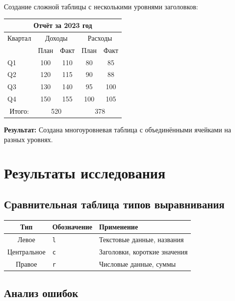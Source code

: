 \documentclass[12pt,a4paper]{article}
\begin{document}
Создание сложной таблицы с несколькими уровнями заголовков:

\begin{center}
\begin{tabular}{|l|c|c|c|c|}
\hline
\multicolumn{5}{|c|}{\textbf{Отчёт за 2023 год}} \\
\hline
\multicolumn{1}{|c|}{Квартал} & \multicolumn{2}{c|}{Доходы} & \multicolumn{2}{c|}{Расходы} \\
\hline
& План & Факт & План & Факт \\
\hline
Q1 & 100 & 110 & 80 & 85 \\
Q2 & 120 & 115 & 90 & 88 \\
Q3 & 130 & 140 & 95 & 100 \\
Q4 & 150 & 155 & 100 & 105 \\
\hline
\multicolumn{1}{|c|}{Итого:} & \multicolumn{2}{c|}{520} & \multicolumn{2}{c|}{378} \\
\hline
\end{tabular}
\end{center}

\textbf{Результат:} Создана многоуровневая таблица с объединёнными ячейками на разных уровнях.

\section{Результаты исследования}

\subsection{Сравнительная таблица типов выравнивания}

\begin{center}
\begin{tabular}{|c|l|l|}
\hline
\textbf{Тип} & \textbf{Обозначение} & \textbf{Применение} \\
\hline
Левое & \texttt{l} & Текстовые данные, названия \\
\hline
Центральное & \texttt{c} & Заголовки, короткие значения \\
\hline
Правое & \texttt{r} & Числовые данные, суммы \\
\hline
\end{tabular}
\end{center}

\subsection{Анализ ошибок}
\end{document}
